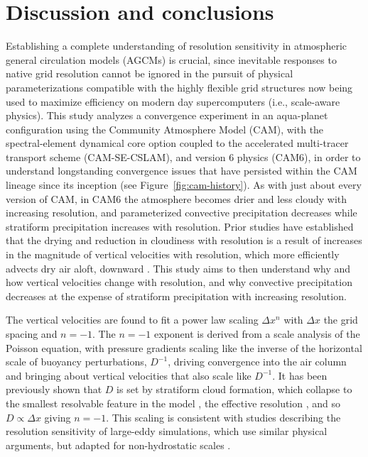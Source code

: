 \documentclass[alpha-refs]{wiley-article}
\begin{document}
\section{Discussion and conclusions}

Establishing a complete understanding of resolution sensitivity in atmospheric general circulation models (AGCMs) is crucial, since inevitable responses to native grid resolution cannot be ignored in the pursuit of physical parameterizations compatible with the highly flexible grid structures now being used to maximize efficiency on modern day supercomputers (i.e., scale-aware physics). This study analyzes a convergence experiment in an aqua-planet configuration using the Community Atmosphere Model (CAM), with the spectral-element dynamical core option coupled to the accelerated multi-tracer transport scheme (CAM-SE-CSLAM), and version 6 physics (CAM6), in order to understand longstanding convergence issues that have persisted within the CAM lineage since its inception (see Figure~\ref{fig:cam-history}). As with just about every version of CAM, in CAM6 the atmosphere becomes drier and less cloudy with increasing resolution, and parameterized convective precipitation decreases while stratiform precipitation increases with resolution. Prior studies have established that the drying and reduction in cloudiness with resolution is a result of increases in the magnitude of vertical velocities with resolution, which more efficiently advects dry air aloft, downward \citep{KW1991JGR,WETAL1995CD,HR2017JCLIM}. This study aims to then understand why and how vertical velocities change with resolution, and why convective precipitation decreases at the expense of stratiform precipitation with increasing resolution.

The vertical velocities are found to fit a power law scaling $\Delta x^n$ with $\Delta x$ the grid spacing and $n=-1$. The $n=-1$ exponent is derived from a scale analysis of the Poisson equation, with pressure gradients scaling like the inverse of the horizontal scale of buoyancy perturbations, $D^{-1}$, driving convergence into the air column and bringing about vertical velocities that also scale like $D^{-1}$. It has been previously shown that $D$ is set by stratiform cloud formation, which collapse to the smallest resolvable feature in the model \citep{HR2018JAMES}, the effective resolution \citep{S2011LNCSE}, and so $D \propto \Delta x$ giving $n=-1$. This scaling is consistent with studies describing the resolution sensitivity of large-eddy simulations, which use similar physical arguments, but adapted for non-hydrostatic scales \citep{WETAL1997MWR,PG2006JAS,JR2016QJRMS}.
\end{document}
